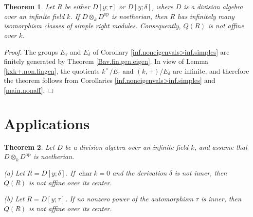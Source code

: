 \documentclass{conm-p-l}
\newtheorem{theorem}{Theorem}[section]
\theoremstyle{definition}
\theoremstyle{remark}
\numberwithin{equation}{section}
\DeclareMathOperator{\ch}{char}
\newcommand{\kx}{k^\times}
\DeclareMathOperator{\op}{op}
\begin{document}
\begin{theorem}  \label{PIDs.w.Q.nonaff}
Let $R$ be either $D[y;\tau]$ or $D[y;\delta]$, where $D$ is a division algebra over an infinite field $k$.  If $D\otimes_k D^{\op}$ is noetherian, then $R$ has infinitely many isomorphism classes of simple right modules.  Consequently, $Q(R)$ is not affine over $k$.
\end{theorem}

\begin{proof}
The groups $E_\tau$ and $E_\delta$ of Corollary \ref{inf.noneigenvals>inf.simples} are finitely generated by Theorem \ref{Bav.fin.gen.eigen}.  In view of Lemma \ref{kxk+.non.fingen}, the quotients $\kx/E_\tau$ and $(k,+)/E_\delta$ are infinite, and therefore the theorem follows from Corollaries \ref{inf.noneigenvals>inf.simples} and \ref{main.nonaff}.
\end{proof}


\section{Applications}

\begin{theorem}  \label{PIDs.w.Q.nonaff/Z}
Let $D$ be a division algebra over an infinite field $k$, and assume that $D\otimes_k D^{\op}$ is noetherian.

{\rm(a)} Let $R = D[y;\delta]$.  If $\ch k = 0$ and the derivation $\delta$ is not inner, then $Q(R)$ is not affine over its center.

{\rm(b)} Let $R = D[y;\tau]$.  If no nonzero power of the automorphism $\tau$ is inner, then $Q(R)$ is not affine over its center.
\end{theorem}
\end{document}
